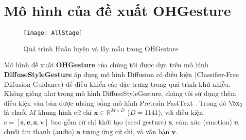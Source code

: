 




\section{Mô hình của đề xuất OHGesture}
\label{sec:ohgesture}



\begin{figure}
	\centering
	\texttt{[image: AllStage]}
	\caption{Quá trình Huấn luyện và lấy mẫu trong OHGesture}
	\label{fig:TrainingAndSampling}
\end{figure}

Mô hình đề xuất \textbf{OHGesture} của chúng tôi được dựa trên mô hình \textbf{DiffuseStyleGesture} \cite{yang2023diffusestylegesture} áp dụng mô hình Diffusion \cite{ho2020denoising} có điều kiện \cite{ho2022classifier} (Classifier-Free Diffusion Guidance) để điều khiển các đặc trưng trong quá trình khử nhiễu. 
Không giống như trong mô hình DiffuseStyleGesture, chúng tôi sử dụng thêm điều kiện văn bản được nhúng bằng mô hình Pretrain FastText  \cite{bojanowski2017enriching}.
Trong đó $\bx_0$ là chuỗi $M$ khung hình cử chỉ $\mathbf{x} \in \mathbb{R}^{M \times D}$ ($D = 1141$), với điều kiện $c = [\mathbf{s}, \mathbf{e}, \mathbf{a}, \mathbf{v}]$ bao gồm cử chỉ khởi tạo (seed gesture) $\mathbf{s}$,  cảm xúc (emotion) $\mathbf{e}$, chuỗi âm thanh (audio) $\mathbf{a}$ tương ứng cử chỉ, và văn bản  $\mathbf{v}$.

